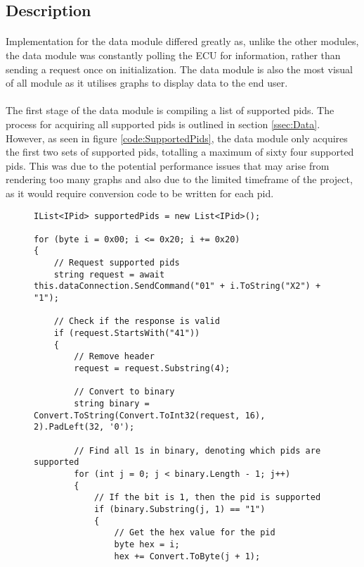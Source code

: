 	\subsection{Description}{		
		\paragraph{}{
		Implementation for the data module differed greatly as, unlike the other modules, the data module was constantly polling the ECU for information, rather than sending a request once on initialization. The data module is also the most visual of all module as it utilises graphs to display data to the end user.
		}
		
		\paragraph{}{
		The first stage of the data module is compiling a list of supported pids. The process for acquiring all supported pids is outlined in section \ref{ssec:Data}. However, as seen in figure \ref{code:SupportedPids}, the data module only acquires the first two sets of supported pids, totalling a maximum of sixty four supported pids. This was due to the potential performance issues that may arise from rendering too many graphs and also due to the limited timeframe of the project, as it would require conversion code to be written for each pid.
		}
		
		\begin{figure}[h]
			\begin{lstlisting}
IList<IPid> supportedPids = new List<IPid>();

for (byte i = 0x00; i <= 0x20; i += 0x20)
{
	// Request supported pids
	string request = await this.dataConnection.SendCommand("01" + i.ToString("X2") + "1");

	// Check if the response is valid
	if (request.StartsWith("41"))
	{
		// Remove header
		request = request.Substring(4);

		// Convert to binary
		string binary = Convert.ToString(Convert.ToInt32(request, 16), 2).PadLeft(32, '0');

		// Find all 1s in binary, denoting which pids are supported
		for (int j = 0; j < binary.Length - 1; j++)
		{
			// If the bit is 1, then the pid is supported
			if (binary.Substring(j, 1) == "1")
			{
				// Get the hex value for the pid
				byte hex = i;
				hex += Convert.ToByte(j + 1);
								

\end{lstlisting}
\end{figure}}
